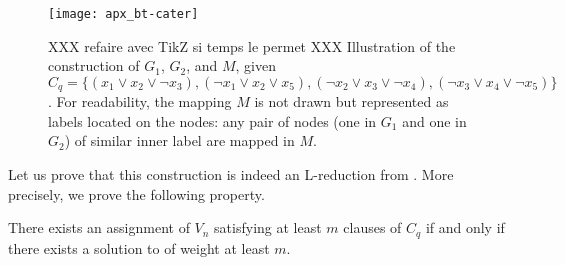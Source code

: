 		\begin{figure}[ht]
    	 	 \centering
    	 	 \texttt{[image: apx\_bt-cater]}
    	 	 \caption{XXX refaire avec TikZ si temps le permet XXX Illustration of the construction of $G_1$, $G_2$, and $M$, given $C_q = \{(x_1 \vee x_2 \vee \neg{}x_3), (\neg{}x_1 \vee x_2 \vee x_5), (\neg{}x_2 \vee x_3 \vee \neg{}x_4), (\neg{}x_3 \vee x_4 \vee \neg{}x_5)\}$. For readability, the mapping $M$ is not drawn but represented as labels located on the nodes: any pair of nodes (one in $G_1$ and one in $G_2$) of similar inner label are mapped in $M$.}
			\label{fig:bt-cater}
		\end{figure}

		Let us prove that this construction is indeed an L-reduction from \msat{}. More precisely, we prove the following property.
		\begin{lemma}
		There exists an assignment of $V_n$ satisfying at least $m$ clauses of $C_q$ if and only if there exists a solution to \mwccs{} of weight at least $m$.
		\end{lemma}

